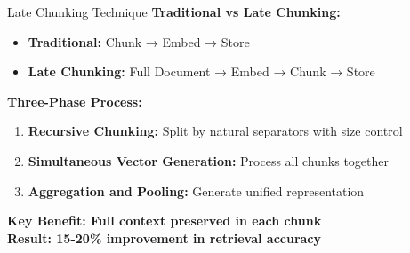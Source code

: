 \begin{frame}{Late Chunking Technique}
    \textbf{Traditional vs Late Chunking:}
    \begin{itemize}
        \item \textbf{Traditional:} Chunk → Embed → Store
        \item \textbf{Late Chunking:} Full Document → Embed → Chunk → Store
    \end{itemize}
    
    \vspace{0.5em}
    
    \textbf{Three-Phase Process:}
    \begin{enumerate}
        \item \textbf{Recursive Chunking:} Split by natural separators with size control
        \item \textbf{Simultaneous Vector Generation:} Process all chunks together
        \item \textbf{Aggregation and Pooling:} Generate unified representation
    \end{enumerate}
    
    \vspace{0.5em}
    
    \begin{center}
        \colorbox{highlight!20}{\textbf{Key Benefit: Full context preserved in each chunk}}\\
        \vspace{0.3em}
        \colorbox{improvement!20}{\textbf{Result: 15-20\% improvement in retrieval accuracy}}
    \end{center}
\end{frame}

